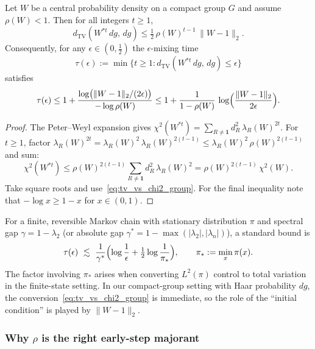 \begin{proposition}\label{prop:mixing_time_group}
Let $W$ be a central probability density on a compact group $G$ and assume $\rho(W)<1$.
Then for all integers $t\ge 1$,
\begin{equation}\label{eq:tv_mixing_bound_group}
 d_{\mathrm{TV}}(W^{*t}\,dg,\,dg)
\le \tfrac12\,\rho(W)^{t-1}\,\|W-1\|_2.
\end{equation}
Consequently, for any $\epsilon\in(0,\tfrac12)$ the $\epsilon$-mixing time
\[
\tau(\epsilon):=\min\{t\ge 1: d_{\mathrm{TV}}(W^{*t}\,dg,\,dg)\le \epsilon\}
\]
satisfies
\begin{equation}\label{eq:mixing_time_bound_group}
 \tau(\epsilon)
\le 1+\frac{\log\bigl(\|W-1\|_2/(2\epsilon)\bigr)}{-\log\rho(W)}
\le 1+\frac{1}{1-\rho(W)}\,\log\Bigl(\frac{\|W-1\|_2}{2\epsilon}\Bigr).
\end{equation}
\end{proposition}

\begin{proof}
The Peter--Weyl expansion gives
$\chi^2(W^{*t})=\sum_{R\ne\mathbf 1} d_R^2\,\lambda_R(W)^{2t}$.
For $t\ge 1$, factor $\lambda_R(W)^{2t}=\lambda_R(W)^2\,\lambda_R(W)^{2(t-1)}\le \lambda_R(W)^2\,\rho(W)^{2(t-1)}$ and sum:
\[
\chi^2(W^{*t})\le \rho(W)^{2(t-1)}\sum_{R\ne\mathbf 1} d_R^2\,\lambda_R(W)^2
=\rho(W)^{2(t-1)}\,\chi^2(W).
\]
Take square roots and use~\eqref{eq:tv_vs_chi2_group}.
For the final inequality note that $-\log x\ge 1-x$ for $x\in(0,1)$.
\end{proof}

\begin{remark}
For a finite, reversible Markov chain with stationary distribution $\pi$ and spectral gap
$\gamma=1-\lambda_2$ (or absolute gap $\gamma^*=1-\max(|\lambda_2|,|\lambda_n|)$), a standard bound is
\[
\tau(\epsilon)\ \lesssim\ \frac{1}{\gamma^*}\Bigl(\log\frac{1}{\epsilon}+\tfrac12\log\frac{1}{\pi_*}\Bigr),
\qquad \pi_*:=\min_x\pi(x).
\]
The factor involving $\pi_*$ arises when converting $L^2(\pi)$ control to total variation in the finite-state setting.
In our compact-group setting with Haar probability $dg$, the conversion~\eqref{eq:tv_vs_chi2_group} is immediate,
so the role of the ``initial condition'' is played by $\|W-1\|_2$.
\end{remark}

\subsubsection{Why \texorpdfstring{$\rho$}{rho} is the right early-step majorant}

